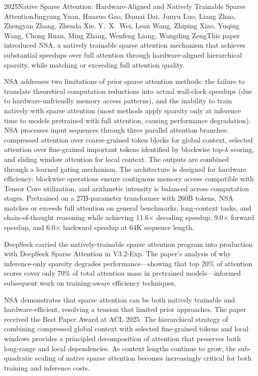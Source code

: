 
\begin{papersummary}{2025}{Native Sparse Attention: Hardware-Aligned and Natively Trainable Sparse Attention}{Jingyang Yuan, Huazuo Gao, Damai Dai, Junyu Luo, Liang Zhao, Zhengyan Zhang, Zhenda Xie, Y.\ X.\ Wei, Lean Wang, Zhiping Xiao, Yuqing Wang, Chong Ruan, Ming Zhang, Wenfeng Liang, Wangding Zeng}{This paper introduced NSA, a natively trainable sparse attention mechanism that achieves substantial speedups over full attention through hardware-aligned hierarchical sparsity, while matching or exceeding full attention quality.}

NSA addresses two limitations of prior sparse attention methods: the failure to translate theoretical computation reductions into actual wall-clock speedups (due to hardware-unfriendly memory access patterns), and the inability to train natively with sparse attention (most methods apply sparsity only at inference time to models pretrained with full attention, causing performance degradation). NSA processes input sequences through three parallel attention branches: compressed attention over coarse-grained token blocks for global context, selected attention over fine-grained important tokens identified by blockwise top-$k$ scoring, and sliding window attention for local context. The outputs are combined through a learned gating mechanism. The architecture is designed for hardware efficiency: blockwise operations ensure contiguous memory access compatible with Tensor Core utilization, and arithmetic intensity is balanced across computation stages. Pretrained on a 27B-parameter transformer with 260B tokens, NSA matches or exceeds full attention on general benchmarks, long-context tasks, and chain-of-thought reasoning while achieving 11.6$\times$ decoding speedup, 9.0$\times$ forward speedup, and 6.0$\times$ backward speedup at 64K sequence length.

DeepSeek carried the natively-trainable sparse attention program into production with DeepSeek Sparse Attention in V3.2-Exp. The paper's analysis of why inference-only sparsity degrades performance---showing that top 20\% of attention scores cover only 70\% of total attention mass in pretrained models---informed subsequent work on training-aware efficiency techniques.

NSA demonstrates that sparse attention can be both natively trainable and hardware-efficient, resolving a tension that limited prior approaches. The paper received the Best Paper Award at ACL 2025. The hierarchical strategy of combining compressed global context with selected fine-grained tokens and local windows provides a principled decomposition of attention that preserves both long-range and local dependencies. As context lengths continue to grow, the sub-quadratic scaling of native sparse attention becomes increasingly critical for both training and inference costs.

\end{papersummary}
